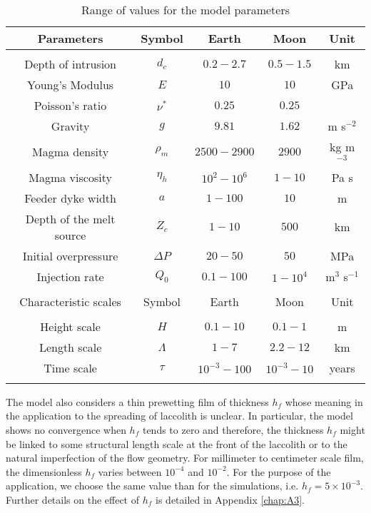 \begin{table}[h!]
  \caption{Range of values for the model parameters}
  \centering
  \begin{tabular}{c|c|c|c|c}
    Parameters& Symbol & Earth & Moon&Unit\\
    \hline
              &&&&\\
    Depth of intrusion & $d_c$ & $0.2-2.7$ &$0.5-1.5$ &km \\
    Young's Modulus & $E$ & $10$ &$10$ &GPa \\
    Poisson's ratio & $\nu^*$ & $0.25$ &$0.25$ &\\
    Gravity & $g$ & $9.81$ &$1.62$&m s$^{-2}$ \\
    Magma density & $\rho_{m}$ & $2500-2900$ &$2900$&kg m$^{-3}$ \\
    Magma viscosity & $\eta_h $ & $10^2-10^{6}$ &$1-10$&Pa s \\
    Feeder dyke width & $a$ & $1-100$ &$10$&m \\
    Depth of the melt source & $Z_{c}$ & $ 1-10$&$ 500$& km \\ 
    Initial overpressure & $\Delta P$ & $20-50$ &$50$ &MPa \\
    Injection rate & $Q_{0}$ &$0.1-100$ &$1-10^4$&m$^{3}$ s$^{-1}$ \\
              &&&&\\
    \hline
    Characteristic scales & Symbol & Earth & Moon&Unit\\
    \hline
              &&&&\\
    Height scale & $H$& $0.1-10$ &$0.1-1$ &m \\
    Length scale & $\Lambda$ & $1-7$&$2.2-12$& km \\
    Time scale & $\tau$ & $10^{-3}-100$&$10^{-3}-10$& years \\
    \label{C2-tab2}
  \end{tabular} 
\end{table}

The model  also considers  a thin prewetting  film of  thickness $h_f$
whose  meaning in  the application  to the  spreading of  laccolith is
unclear.  In  particular, the  model shows  no convergence  when $h_f$
tends to zero \citep{Lister:2013ia} and therefore, the thickness $h_f$
might be  linked to some structural  length scale at the  front of the
laccolith or  to the natural  imperfection of the flow  geometry.  For
millimeter to  centimeter scale  film, the dimensionless  $h_f$ varies
between $10^{-4}$ and  $10^{-2}$. For the purpose  of the application,
we   choose  the   same   value  than   for   the  simulations,   i.e.
$h_f=5\times  10^{-3}$. Further  details  on the  effect  of $h_f$  is
detailed in Appendix \ref{chap:A3}.

